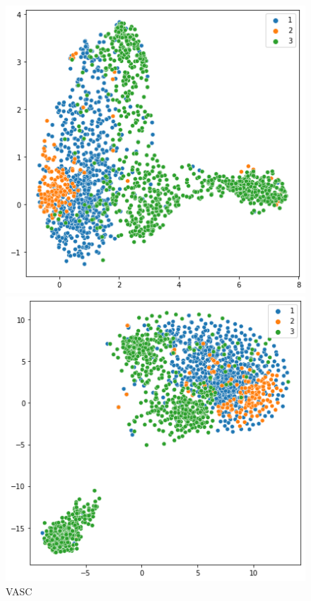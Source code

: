 \documentclass[12 pts]{article}
\begin{document}
\begin{figure}[H]
\begin{minipage}[h]{0.3\textwidth}
\includegraphics[width=\linewidth]{vasc_graph}
\caption*{VASC}
\end{minipage}
\hspace{\fill}
\begin{minipage}[h]{0.3\textwidth}
\includegraphics[width=\linewidth]{tSNE}

\end{minipage}
\end{figure}
\end{document}
